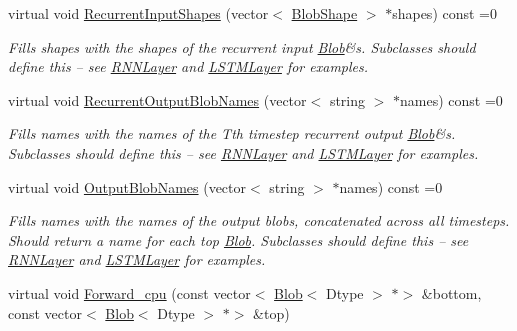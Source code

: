 \begin{DoxyCompactItemize}
virtual void \mbox{\hyperlink{classcaffe_1_1_recurrent_layer_ad2c2427c11960e0b8961c31ff2f74c03}{Recurrent\+Input\+Shapes}} (vector$<$ \mbox{\hyperlink{classcaffe_1_1_blob_shape}{Blob\+Shape}} $>$ $\ast$shapes) const =0
\begin{DoxyCompactList}\small\item\em Fills shapes with the shapes of the recurrent input \mbox{\hyperlink{classcaffe_1_1_blob}{Blob}}\&s. Subclasses should define this -- see \mbox{\hyperlink{classcaffe_1_1_r_n_n_layer}{R\+N\+N\+Layer}} and \mbox{\hyperlink{classcaffe_1_1_l_s_t_m_layer}{L\+S\+T\+M\+Layer}} for examples. \end{DoxyCompactList}\item 
\mbox{\label{classcaffe_1_1_recurrent_layer_a5fd43ae201c4284a1cc3d93f72702bbe}} 
virtual void \mbox{\hyperlink{classcaffe_1_1_recurrent_layer_a5fd43ae201c4284a1cc3d93f72702bbe}{Recurrent\+Output\+Blob\+Names}} (vector$<$ string $>$ $\ast$names) const =0
\begin{DoxyCompactList}\small\item\em Fills names with the names of the Tth timestep recurrent output \mbox{\hyperlink{classcaffe_1_1_blob}{Blob}}\&s. Subclasses should define this -- see \mbox{\hyperlink{classcaffe_1_1_r_n_n_layer}{R\+N\+N\+Layer}} and \mbox{\hyperlink{classcaffe_1_1_l_s_t_m_layer}{L\+S\+T\+M\+Layer}} for examples. \end{DoxyCompactList}\item 
\mbox{\label{classcaffe_1_1_recurrent_layer_af0b87f8e9a422338243ffeb7f16121fa}} 
virtual void \mbox{\hyperlink{classcaffe_1_1_recurrent_layer_af0b87f8e9a422338243ffeb7f16121fa}{Output\+Blob\+Names}} (vector$<$ string $>$ $\ast$names) const =0
\begin{DoxyCompactList}\small\item\em Fills names with the names of the output blobs, concatenated across all timesteps. Should return a name for each top \mbox{\hyperlink{classcaffe_1_1_blob}{Blob}}. Subclasses should define this -- see \mbox{\hyperlink{classcaffe_1_1_r_n_n_layer}{R\+N\+N\+Layer}} and \mbox{\hyperlink{classcaffe_1_1_l_s_t_m_layer}{L\+S\+T\+M\+Layer}} for examples. \end{DoxyCompactList}\item 
virtual void \mbox{\hyperlink{classcaffe_1_1_recurrent_layer_a1dffda3073cd6f93a80c73b27c4dd0ba}{Forward\+\_\+cpu}} (const vector$<$ \mbox{\hyperlink{classcaffe_1_1_blob}{Blob}}$<$ Dtype $>$ $\ast$$>$ \&bottom, const vector$<$ \mbox{\hyperlink{classcaffe_1_1_blob}{Blob}}$<$ Dtype $>$ $\ast$$>$ \&top)

\end{DoxyCompactItemize}

